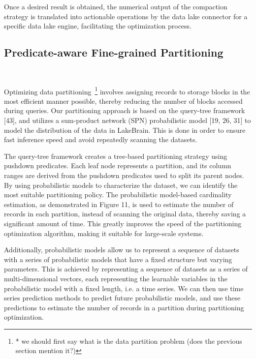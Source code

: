Once a desired result is obtained, the numerical output of the compaction strategy is translated into actionable operations by the data lake connector for a specific data lake engine, facilitating the optimization process.


\subsection{Predicate-aware Fine-grained Partitioning}~\label{subsec:partition}

Optimizing data partitioning~\footnote{* we should first say what is the data partition problem (does the previous section mention it?)} involves assigning records to storage blocks in the most efficient manner possible, thereby reducing the number of blocks accessed during queries. Our partitioning approach is based on the query-tree framework [43], and utilizes a sum-product network (SPN) probabilistic model [19, 26, 31] to model the distribution of the data in LakeBrain. This is done in order to ensure fast inference speed and avoid repeatedly scanning the datasets.



The query-tree framework creates a tree-based partitioning strategy using pushdown predicates. Each leaf node represents a partition, and its column ranges are derived from the pushdown predicates used to split its parent nodes.
 By using probabilistic models to characterize the dataset, we can identify the most suitable partitioning policy. The probabilistic model-based cardinality estimation, as demonstrated in Figure 11, is used to estimate the number of records in each partition,  instead of scanning the original data, thereby saving a significant amount of time. This greatly improves the speed of the partitioning optimization algorithm, making it suitable for large-scale systems.

Additionally, probabilistic models allow us to represent a sequence of datasets with a series of probabilistic models that have a fixed structure but varying parameters. This is achieved by representing a sequence of datasets as a series of multi-dimensional vectors, each representing the learnable variables in the probabilistic model with a fixed length, i.e. a time series. We can then use time series prediction methods to predict future probabilistic models, and use these predictions to estimate the number of records in a partition during partitioning optimization.

